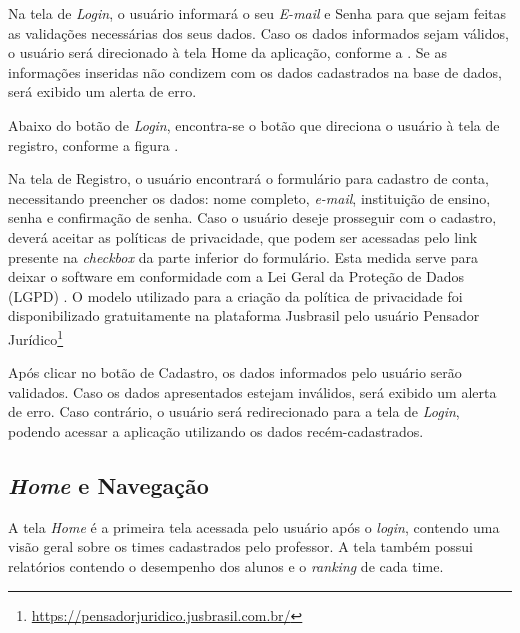 
Na tela de \textit{Login}, o usuário informará o seu \textit{E-mail} e Senha para que sejam feitas as validações necessárias dos seus dados. Caso os dados informados sejam válidos, o usuário será direcionado à tela Home da aplicação, conforme a . Se as informações inseridas não condizem com os dados cadastrados na base de dados, será exibido um alerta de erro. 

Abaixo do botão de \textit{Login}, encontra-se o botão que direciona o usuário à tela de registro, conforme a figura .


Na tela de Registro, o usuário encontrará o formulário para cadastro de conta, necessitando preencher os dados: nome completo, \textit{e-mail}, instituição de ensino, senha e confirmação de senha. Caso o usuário deseje prosseguir com o cadastro, deverá aceitar as políticas de privacidade, que podem ser acessadas pelo link presente na \textit{checkbox} da parte inferior do formulário. Esta medida serve para deixar o software em conformidade com a Lei Geral da Proteção de Dados (LGPD) \cite{lgpd}. O modelo utilizado para a criação da política de privacidade foi disponibilizado gratuitamente na plataforma Jusbrasil pelo usuário Pensador Jurídico\footnote{\url{https://pensadorjuridico.jusbrasil.com.br/}} \cite{politica-privacidade}

Após clicar no botão de Cadastro, os dados informados pelo usuário serão validados. Caso os dados apresentados estejam inválidos, será exibido um alerta de erro. Caso contrário, o usuário será redirecionado para a tela de \textit{Login}, podendo acessar a aplicação utilizando os dados recém-cadastrados.

\subsection{\textit{Home} e Navegação}

A tela \textit{Home} é a primeira tela acessada pelo usuário após o \textit{login}, contendo uma visão geral sobre os times cadastrados pelo professor. A tela também possui relatórios contendo o desempenho dos alunos e o \textit{ranking} de cada time.


